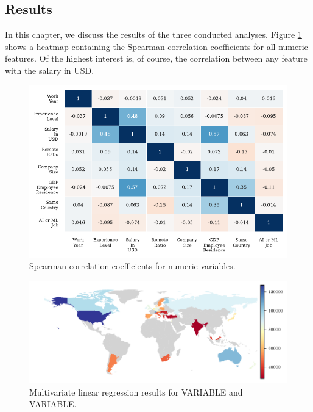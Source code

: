 \documentclass{article}
\begin{document}



\subsection{Results}
In this chapter, we discuss the results of the three conducted analyses. Figure \ref{fig:correlations} shows a heatmap containing the Spearman correlation coefficients for all numeric features. Of the highest interest is, of course, the correlation between any feature with the salary in USD.

\begin{figure}[ht]
    \centering
    \includegraphics{correlations.pdf}
    \caption{Spearman correlation coefficients for numeric variables.}
    \label{fig:correlations}
\end{figure}

\begin{figure}[ht]
    \centering
    \includegraphics{choropleth.pdf}
    \caption{Multivariate linear regression results for VARIABLE and VARIABLE.}
    \label{fig:regression}
\end{figure}
\end{document}
